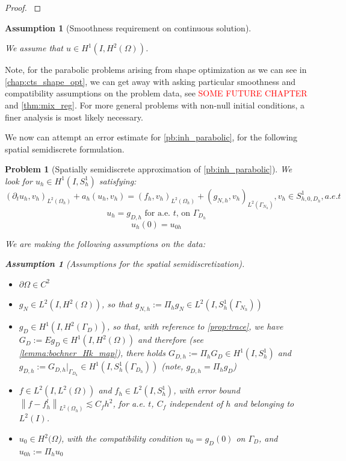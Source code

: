 \documentclass[english,a4paper,9pt,oneside]{scrbook}	%
\theoremstyle{break}
\newtheorem{ass}[equation]{Assumption}
\newtheorem{pb}[equation]{Problem}
\newenvironment{mproof}[1][\proofname]{%
  \begin{proof}[#1]$ $\par\nobreak\ignorespaces
}{%
  \end{proof}
}
\renewcommand*{\proofname}{Proof}
\theoremstyle{remark}
\newcommand{\norm}[1]{\left\lVert#1\right\rVert}
\begin{document}
\begin{appendices}
\begin{mproof}
\end{mproof}

\begin{ass}[Smoothness requirement on continuous solution]
\label{ass:smoothness_par_discr}

We assume that $u \in H^1(I, H^2(\Omega))$.
\end{ass}

Note, for the parabolic problems arising from shape optimization as we can see in \cref{chap:cts_shape_opt}, we can get away with asking particular smoothness and compatibility assumptions on the problem data, see \textcolor{red}{SOME FUTURE CHAPTER} and \cref{thm:mix_reg}. For more general problems with non-null initial conditions, a finer analysis is most likely necessary.

We now can attempt an error estimate for \cref{pb:inh_parabolic}, for the following spatial semidiscrete formulation.

\begin{pb}[Spatially semidiscrete approximation of \cref{pb:inh_parabolic}]
\label{pb:inh_parabolic_discr}
We look for $u_h \in H^1(I, S^1_h)$ satisfying: 
$$(\partial_t u_h, v_h)_{L^2(\Omega_h)} + a_h(u_h, v_h) = (f_h, v_h)_{L^2(\Omega_h)} + (g_{N,h}, v_h)_{L^2(\Gamma_{N_h})}, v_h \in S^1_{h,0,D_h}, a.e. t$$
$$u_h=g_{D,h}\text{ for a.e. }t \text{,  on } \Gamma_{D_h}$$
$$u_h(0)=u_{0h}$$

We are making the following assumptions on the data:

\begin{ass}[Assumptions for the spatial semidiscretization]
\label{ass:discr_reg}
\textcolor{white}{ }
\begin{itemize}
	\item $\partial \Omega \in C^2$
	\item $g_N \in L^2(I,H^2(\Omega))$, so that $g_{N,h}:=\Pi_h g_N \in L^2(I, S^1_h(\Gamma_{N_h}))$
	\item $g_D \in H^1(I, H^{2}(\Gamma_D))$, so that, with reference to \cref{prop:trace}, we have $G_D:=Eg_D \in H^1(I,H^2(\Omega))$ and therefore (see \cref{lemma:bochner_Hk_map}), there holds	 $G_{D,h}:=\Pi_h G_D \in H^1(I, S^1_h)$ and $g_{D,h}:=G_{D,h}|_{\Gamma_{D_h}} \in H^1(I, S^1_h(\Gamma_{D_h}))$ (note, $g_{D,h} = \Pi_h g_D$)
	\item $f \in L^2(I,L^2(\Omega))$ and $f_h \in L^2(I, S^1_h)$, with error bound  $\norm{f-f_h^l}_{L^2(\Omega_h)}\lesssim C_f h^2$, for a.e. $t$, $C_f$ independent of $h$ and belonging to $L^2(I)$.
	\item $u_0\in H^2(\Omega$), with the compatibility condition $u_{0} = g_{D}(0)$ on $\Gamma_{D}$, and $u_{0h}:=\Pi_h u_0$
\end{itemize}


\end{ass}
\end{pb}
\end{appendices}
\end{document}
